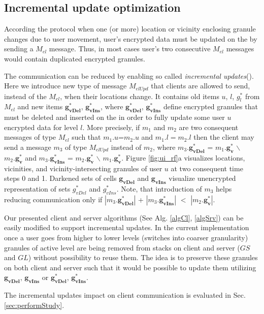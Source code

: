 \subsection{Incremental update optimization}\label{sec:optIncUpd}

According the protocol when one (or more) location or vicinity enclosing
granule changes due to user movement, user's encrypted data must
be updated on the \ls by sending a $M_{el}$ message. Thus, in most
cases user's two consecutive $M_{el}$ messages would contain duplicated 
encrypted granules. 

The communication can be reduced by enabling so called \textit{incremental
updates}(\iuns). Here we introduce new type of message $M_{elUpd}$ that clients 
are allowed to send, instead of the $M_{el}$, when their locations change. 
It contains old items $u$, $l$, $g^*_l$ from $M_{el}$ and new items 
$\mathbf{g^*_{vDel}}$, $\mathbf{g^*_{vIns}}$, where $\mathbf{g^*_{vDel}}$, 
$\mathbf{g^*_{vIns}}$ define encrypted granules that must be deleted and inserted 
on the \ls in order to fully update some user $u$ encrypted data for level $l$. 
More precisely, if $m_1$ and $m_2$ are two consequent messages of type 
$M_{el}$ such that $m_1.u$=$m_2.u$ and $m_1.l = m_2.l$ then the
client may send a message $m_3$ of type $M_{elUpd}$ instead of $m_2$, where
$m_3.\mathbf{g^*_{vDel}}$ = $m_1.\mathbf{g^*_{v}}$
$\backslash$ $m_2.\mathbf{g^*_{v}}$ and $m_3.\mathbf{g^*_{vIns}}$ =
$m_2.\mathbf{g^*_{v}}$ $\backslash$ $m_1.\mathbf{g^*_{v}}$. 
Figure \ref{fig:ui_rf}a visualizes locations, vicinities, and 
vicinity-intersecting granules of user $u$ at two consequent 
time steps 0 and 1. Darkened sets of cells $\mathbf{g_{vDel}}$ and 
$\mathbf{g_{vIns}}$ visualize unencrypted representation of sets $g^*_{vDel}$ 
and $g^*_{vIns}$. Note, that introduction of $m_3$ helps reducing communication
only if $|m_3.\mathbf{g^*_{vDel}}|$ + $|m_3.\mathbf{g^*_{vIns}}|$ $<$
$|m_2.\mathbf{g^*_{v}}|$. 


Our presented client and server algorithms (See Alg. \ref{algCl}, \ref{algSrv})
can be easily modified to support incremental updates. In the current
implementation once a user goes from higher to lower levels (switches into
coarser granularity) granules of active level are being removed from stacks
on client and server ($GS$ and $GL$) without possibility to reuse them. The idea
is to preserve these granules on both client and server such that it would be
possible to update them utilizing $\mathbf{g_{vDel}}$, $\mathbf{g_{vIns}}$ or
$\mathbf{g^*_{vDel}}$, $\mathbf{g^*_{vIns}}$. 

The incremental updates impact on client communication is evaluated in 
Sec. \ref{sec:performStudy}.


